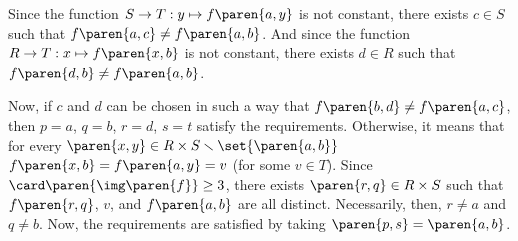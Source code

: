 Since the function $S \to T : y \mapsto f\paren{a, y}$ is not constant,
there exists $c \in S$ such that $f\paren{a, c} \neq f\paren{a, b}$.
And since the function $R \to T : x \mapsto f\paren{x, b}$ is not constant,
there exists $d \in R$ such that $f\paren{d, b} \neq f\paren{a, b}$.

Now, if $c$ and $d$ can be chosen in such a way that $f\paren{b, d} \neq f\paren{a, c}$,
then $p = a$, $q = b$, $r = d$, $s = t$ satisfy the requirements.\newline
Otherwise, it means that for every $\paren{x, y} \in R \times S \smallsetminus \set{\paren{a, b}}$
$f\paren{x, b} = f\paren{a, y} = v$ (for some $v \in T$).
Since $\card\paren{\img\paren{f}} \geq 3$, there exists $\paren{r, q} \in R \times S$
such that $f\paren{r, q}$, $v$, and $f\paren{a, b}$ are all distinct.
Necessarily, then, $r \neq a$ and $q \neq b$.
Now, the requirements are satisfied by taking $\paren{p, s} = \paren{a, b}$.
